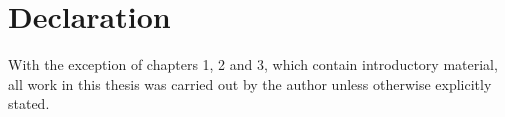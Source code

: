 \chapter{Declaration}
With the exception of chapters 1, 2 and 3, which contain introductory material, all work in this thesis was carried out by the author unless otherwise explicitly stated.
